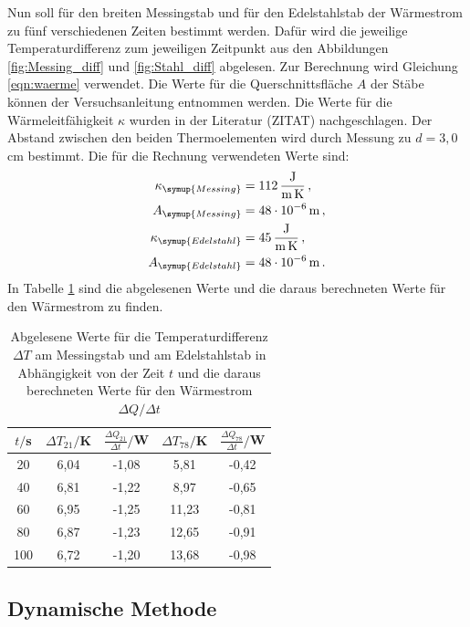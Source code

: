 Nun soll für den breiten Messingstab und für den Edelstahlstab der Wärmestrom
zu fünf verschiedenen Zeiten bestimmt werden. Dafür wird die jeweilige Temperaturdifferenz
zum jeweiligen Zeitpunkt aus den Abbildungen \ref{fig:Messing_diff} und
\ref{fig:Stahl_diff} abgelesen. Zur Berechnung wird Gleichung \eqref{eqn:waerme}
verwendet. Die Werte für die Querschnittsfläche $A$ der Stäbe können der Versuchsanleitung
\cite{Versuchsanleitung} entnommen werden. Die Werte für die Wärmeleitfähigkeit $\kappa$ wurden in der
Literatur (ZITAT) nachgeschlagen. Der Abstand zwischen den beiden Thermoelementen
wird durch Messung zu $d=3,0$\,cm bestimmt. Die für die Rechnung verwendeten Werte sind:
\begin{align}
  \kappa_{\symup{Messing}} &= \SI{112}{\joule\per\meter\per\kelvin}\,, \nonumber\\
  A_{\symup{Messing}} &= \SI{48e-6}{\meter}\,, \nonumber\\
  \kappa_{\symup{Edelstahl}} &= \SI{45}{\joule\per\meter\per\kelvin}\,, \nonumber\\
  A_{\symup{Edelstahl}} &= \SI{48e-6}{\meter}\,. \nonumber
\end{align}
In Tabelle \ref{tab:waermestrom} sind die abgelesenen Werte und die daraus berechneten Werte
für den Wärmestrom zu finden.

\begin{table}
  \centering
  \caption{Abgelesene Werte für die Temperaturdifferenz $\Delta T$ am Messingstab und am Edelstahlstab
  in Abhängigkeit von der Zeit $t$ und die daraus berechneten Werte für den Wärmestrom
  $\Delta Q/\Delta t$}
  \label{tab:waermestrom}
  \begin{tabular}{c c c c c}
    \toprule
    $t/$s & $\Delta T_{21}/$K & $\frac{\Delta Q_{21}}{\Delta t}/$W & $\Delta T_{78}/$K & $\frac{\Delta Q_{78}}{\Delta t}/$W \\
    \midrule
    20  & 6,04  & -1,08 & 5,81  & -0,42 \\
    40  & 6,81  & -1,22 & 8,97  & -0,65 \\
    60  & 6,95  & -1,25 & 11,23 & -0,81 \\
    80  & 6,87  & -1,23 & 12,65 & -0,91 \\
    100 & 6,72  & -1,20 & 13,68 & -0,98 \\
    \bottomrule
  \end{tabular}
\end{table}


\subsection{Dynamische Methode}
\label{sec:auswertung_dynamisch}

